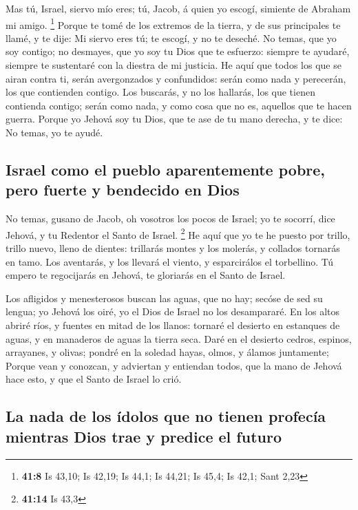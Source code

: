  Mas tú, Israel, siervo mío eres; tú, Jacob, á quien yo
escogí, simiente de Abraham mi amigo. \footnote{\textbf{41:8} Is 43,10;
  Is 42,19; Is 44,1; Is 44,21; Is 45,4; Is 42,1; Sant 2,23} 
Porque te tomé de los extremos de la tierra, y de sus principales te
llamé, y te dije: Mi siervo eres tú; te escogí, y no te deseché.
 No temas, que yo soy contigo; no desmayes, que yo soy tu
Dios que te esfuerzo: siempre te ayudaré, siempre te sustentaré con la
diestra de mi justicia.  He aquí que todos los que se airan
contra ti, serán avergonzados y confundidos: serán como nada y
perecerán, los que contienden contigo.  Los buscarás, y no
los hallarás, los que tienen contienda contigo; serán como nada, y como
cosa que no es, aquellos que te hacen guerra.  Porque yo
Jehová soy tu Dios, que te ase de tu mano derecha, y te dice: No temas,
yo te ayudé.

\hypertarget{israel-como-el-pueblo-aparentemente-pobre-pero-fuerte-y-bendecido-en-dios}{%
\subsection{Israel como el pueblo aparentemente pobre, pero fuerte y
bendecido en
Dios}\label{israel-como-el-pueblo-aparentemente-pobre-pero-fuerte-y-bendecido-en-dios}}

 No temas, gusano de Jacob, oh vosotros los pocos de
Israel; yo te socorrí, dice Jehová, y tu Redentor el Santo de Israel.
\footnote{\textbf{41:14} Is 43,3}  He aquí que yo te he
puesto por trillo, trillo nuevo, lleno de dientes: trillarás montes y
los molerás, y collados tornarás en tamo.  Los aventarás, y
los llevará el viento, y esparcirálos el torbellino. Tú empero te
regocijarás en Jehová, te gloriarás en el Santo de Israel.

 Los afligidos y menesterosos buscan las aguas, que no hay;
secóse de sed su lengua; yo Jehová los oiré, yo el Dios de Israel no los
desampararé.  En los altos abriré ríos, y fuentes en mitad
de los llanos: tornaré el desierto en estanques de aguas, y en manaderos
de aguas la tierra seca.  Daré en el desierto cedros,
espinos, arrayanes, y olivas; pondré en la soledad hayas, olmos, y
álamos juntamente;  Porque vean y conozcan, y adviertan y
entiendan todos, que la mano de Jehová hace esto, y que el Santo de
Israel lo crió.

\hypertarget{la-nada-de-los-uxeddolos-que-no-tienen-profecuxeda-mientras-dios-trae-y-predice-el-futuro}{%
\subsection{La nada de los ídolos que no tienen profecía mientras Dios
trae y predice el
futuro}\label{la-nada-de-los-uxeddolos-que-no-tienen-profecuxeda-mientras-dios-trae-y-predice-el-futuro}}

